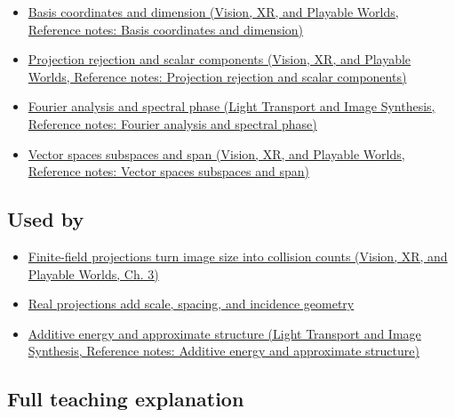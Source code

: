 \begin{itemize}
\tightlist
\item
  \href{../07-Vision-XR-and-Playable-Worlds/main.pdf\#nameddest=appendix-ce0341f7ea0d}{Basis coordinates and dimension (Vision, XR, and Playable Worlds, Reference notes: Basis coordinates and dimension)}
\item
  \href{../07-Vision-XR-and-Playable-Worlds/main.pdf\#nameddest=appendix-505a502c372a}{Projection rejection and scalar components (Vision, XR, and Playable Worlds, Reference notes: Projection rejection and scalar components)}
\item
  \href{../04-Light-Transport-and-Image-Synthesis/main.pdf\#nameddest=appendix-b60686ba06a1}{Fourier analysis and spectral phase (Light Transport and Image Synthesis, Reference notes: Fourier analysis and spectral phase)}
\item
  \href{../07-Vision-XR-and-Playable-Worlds/main.pdf\#nameddest=appendix-173b52c063ae}{Vector spaces subspaces and span (Vision, XR, and Playable Worlds, Reference notes: Vector spaces subspaces and span)}
\end{itemize}

\subsection{Used by}\label{appendix-3c73f7862157-used-by}

\begin{itemize}
\tightlist
\item
  \href{../07-Vision-XR-and-Playable-Worlds/main.pdf\#nameddest=04-visual-computing-ii-ch032-finite-field-projections-turn-image-size-into-collision-counts}{Finite-field projections turn image size into collision counts (Vision, XR, and Playable Worlds, Ch. 3)}
\item
  \hyperref[04-visual-computing-ii-ch033-real-projections-add-scale-spacing-and-incidence-geometry]{Real projections add scale, spacing, and incidence geometry}
\item
  \href{../04-Light-Transport-and-Image-Synthesis/main.pdf\#nameddest=appendix-b0732b22e7d6}{Additive energy and approximate structure (Light Transport and Image Synthesis, Reference notes: Additive energy and approximate structure)}
\end{itemize}

\subsection{Full teaching explanation}\label{appendix-3c73f7862157-full-teaching-explanation}

